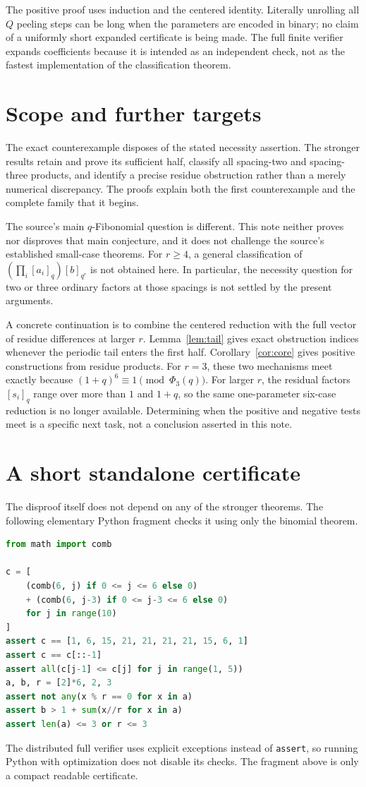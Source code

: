 \documentclass[11pt]{article}
\theoremstyle{research}
\theoremstyle{definition}
\newcommand{\qi}[1]{[#1]_q}
\newcommand{\qir}[2]{[#1]_{q^{#2}}}
\numberwithin{equation}{section}
\begin{document}
The positive proof uses induction and the centered identity.
Literally unrolling all $Q$ peeling steps can be long when the parameters
are encoded in binary; no claim of a uniformly short expanded
certificate is being made. The full finite verifier expands coefficients
because it is intended as an independent check, not as the fastest
implementation of the classification theorem.

\section{Scope and further targets}
\label{sec:scope}
The exact counterexample disposes of the stated necessity assertion.
The stronger results retain and prove its sufficient half, classify all
spacing-two and spacing-three products, and identify a precise residue
obstruction rather than a merely numerical discrepancy.
The proofs explain both the first counterexample and the complete family
that it begins.

The source's main $q$-Fibonomial question is different. This note neither
proves nor disproves that main conjecture, and it does not challenge the
source's established small-case theorems.
For $r\ge4$, a general classification of
$(\prod_i\qi{a_i})\qir b r$ is not obtained here. In particular, the
necessity question for two or three ordinary factors at those spacings
is not settled by the present arguments.

A concrete continuation is to combine the centered reduction with the
full vector of residue differences at larger $r$.
Lemma~\ref{lem:tail} gives exact obstruction indices whenever the
periodic tail enters the first half. Corollary~\ref{cor:core} gives
positive constructions from residue products.
For $r=3$, these two mechanisms meet exactly because
$(1+q)^6\equiv1\pmod{\Phi_3(q)}$.
For larger $r$, the residual factors $\qi{s_i}$ range over more than
$1$ and $1+q$, so the same one-parameter six-case reduction is no longer
available. Determining when the positive and negative tests meet is a
specific next task, not a conclusion asserted in this note.

\appendix
\section{A short standalone certificate}
The disproof itself does not depend on any of the stronger theorems.
The following elementary Python fragment checks it using only the
binomial theorem.
\begin{lstlisting}[language=Python]
from math import comb

c = [
    (comb(6, j) if 0 <= j <= 6 else 0)
    + (comb(6, j-3) if 0 <= j-3 <= 6 else 0)
    for j in range(10)
]
assert c == [1, 6, 15, 21, 21, 21, 21, 15, 6, 1]
assert c == c[::-1]
assert all(c[j-1] <= c[j] for j in range(1, 5))
a, b, r = [2]*6, 2, 3
assert not any(x % r == 0 for x in a)
assert b > 1 + sum(x//r for x in a)
assert len(a) <= 3 or r <= 3
\end{lstlisting}
The distributed full verifier uses explicit exceptions instead of
\texttt{assert}, so running Python with optimization does not disable its
checks. The fragment above is only a compact readable certificate.
\end{document}
